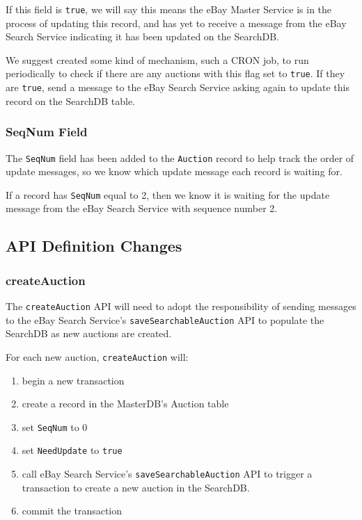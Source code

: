 \documentclass[12pt,a4paper]{article}
\begin{document}
\vspace{\baselineskip}
If this field is \texttt{true}, we will say this means the eBay Master Service is 
in the process of updating this record, and has yet to receive a message from the eBay Search Service 
indicating it has been updated on the SearchDB. 

\vspace{\baselineskip}

We suggest created some kind of mechanism, such a CRON job, to run periodically 
to check if there are any auctions with this flag set to \texttt{true}. 
If they are \texttt{true}, send a message to the eBay Search Service asking again 
to update this record on the SearchDB table.



\subsubsection{SeqNum Field}
The \texttt{SeqNum} field has been added to the \texttt{Auction} record to help
track the order of update messages, so we know which update message each record
is waiting for. 

\vspace{\baselineskip}
If a record has \texttt{SeqNum} equal to 2, then we know it is waiting for the 
update message from the eBay Search Service with sequence number 2.




\pagebreak
\subsection{API Definition Changes}

\subsubsection{createAuction}

The \texttt{createAuction} API will need to adopt the responsibility of sending messages to the eBay Search Service's
\texttt{saveSearchableAuction} API to populate the SearchDB as new auctions are created. 
\vspace{\baselineskip}

For each new auction, \texttt{createAuction} will:

\begin{enumerate}
    \item begin a new transaction
    \item create a record in the MasterDB's Auction table
    \item set \texttt{SeqNum} to 0
    \item set \texttt{NeedUpdate} to \texttt{true}
    \item call eBay Search Service's \texttt{saveSearchableAuction} API to trigger a transaction to create 
    a new auction in the SearchDB.
    \item commit the transaction
\end{enumerate}
\end{document}
